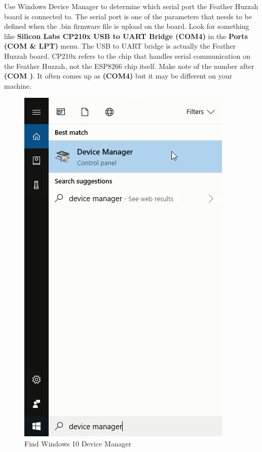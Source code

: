 \documentclass{book}
\makeatletter
\def\maxwidth{\ifdim\Gin@nat@width>\linewidth\linewidth
    \else\Gin@nat@width\fi}
\let\Oldincludegraphics\includegraphics
\renewcommand{\includegraphics}[1]{\Oldincludegraphics[width=.8\maxwidth]{#1}}
\makeatother
\begin{document}
    Use Windows Device Manager to determine which serial port the Feather
Huzzah board is connected to. The serial port is one of the parameters
that needs to be defined when the .bin firmware file is upload on the
board. Look for something like \textbf{Silicon Labs CP210x USB to UART
Bridge (COM4)} in the \textbf{Ports (COM \& LPT)} menu. The USB to UART
bridge is actually the Feather Huzzah board. CP210x refers to the chip
that handles serial communication on the Feather Huzzah, not the ESP8266
chip itself. Make note of the number after \textbf{(COM )}. It often
comes up as \textbf{(COM4)} but it may be different on your machine.

\begin{figure}
\centering
\includegraphics{images/find_device_manager.png}
\caption{Find Windows 10 Device Manager}
\end{figure}
\end{document}
